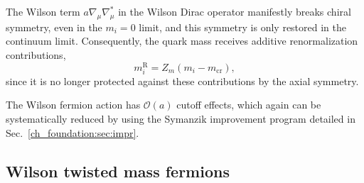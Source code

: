 The Wilson term $a\nabla_{\mu}\nabla_{\mu}^*$ in the Wilson Dirac operator manifestly breaks chiral symmetry, even in the $m_i=0$ limit, and this symmetry is only restored in the continuum limit. Consequently, the quark mass receives additive renormalization contributions, 
\begin{equation}
m_i^{\textrm{R}}=Z_m\left(m_i-m_{\textrm{cr}}\right),
\end{equation}
since it is no longer protected against these contributions by the axial symmetry.

The Wilson fermion action has $\mathcal{O}(a)$ cutoff effects, which again can be systematically reduced by using the Symanzik improvement program detailed in Sec.~\ref{ch_foundation:sec:impr}.


\subsection{Wilson twisted mass fermions}
\label{ch_foundation:subsec:tm}

